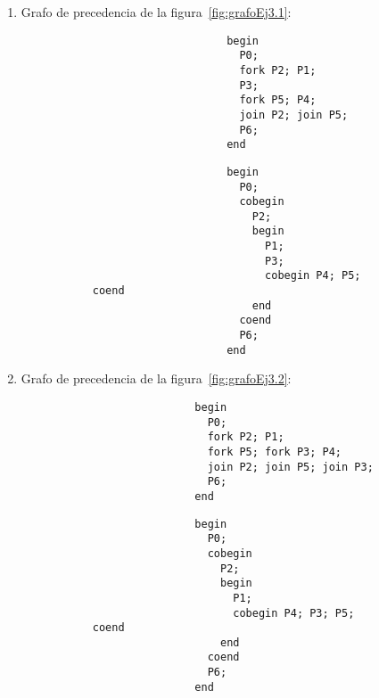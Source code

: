 \begin{ejercicio}
    \begin{enumerate}
        \item \label{ej:3.1}
         Grafo de precedencia de la figura~\ref{fig:grafoEj3.1}:

         \begin{figure}[H]
             \centering
             \begin{subfigure}[b]{0.45\textwidth}
                \centering
                 \begin{verbatim}
                     begin
                       P0;
                       fork P2; P1;
                       P3;
                       fork P5; P4;
                       join P2; join P5;
                       P6;
                     end
                 \end{verbatim}
             \end{subfigure}\hfill
             \begin{subfigure}[b]{0.45\textwidth}
                \centering
                 \begin{verbatim}
                     begin
                       P0;
                       cobegin
                         P2;
                         begin
                           P1;
                           P3;
                           cobegin P4; P5; coend
                         end
                       coend
                       P6;
                     end
                 \end{verbatim}
             \end{subfigure}
         \end{figure}
                 
        \item \label{ej:3.2}
        Grafo de precedencia de la figura~\ref{fig:grafoEj3.2}:
        \begin{figure}[H]
            \centering
            \begin{subfigure}[b]{0.45\textwidth}
                \centering
                \begin{verbatim}
                begin
                  P0;
                  fork P2; P1;
                  fork P5; fork P3; P4;
                  join P2; join P5; join P3;
                  P6;
                end
                \end{verbatim}
            \end{subfigure}\hfill
            \begin{subfigure}[b]{0.45\textwidth}
                \centering
                \begin{verbatim}
                begin
                  P0;
                  cobegin
                    P2;
                    begin
                      P1;
                      cobegin P4; P3; P5; coend
                    end
                  coend
                  P6;
                end
                \end{verbatim}
            \end{subfigure}
        \end{figure}
        

\end{enumerate}
\end{ejercicio}
